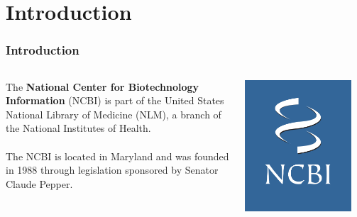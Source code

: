 \documentclass{beamer}
\begin{document}
\section{Introduction}
\begin{frame}
\frametitle{Introduction}
  \begin{columns}[T]
    \begin{column}{.6\textwidth}
     \begin{block}{}
The {\bf National Center for Biotechnology Information} (NCBI) is part of the United States National Library of Medicine (NLM), a branch of the National Institutes of Health.  \pause\\ 
\hspace{0.3cm} \\
The NCBI is located in Maryland and was founded in 1988 through legislation sponsored by Senator Claude Pepper.
    \end{block}
    \end{column}
    \begin{column}{.4\textwidth}
    \begin{block}{}
    \includegraphics[width=0.9\textwidth]{table1.png}
    \end{block}
    \end{column}
  \end{columns}
\end{frame}
\end{document}
